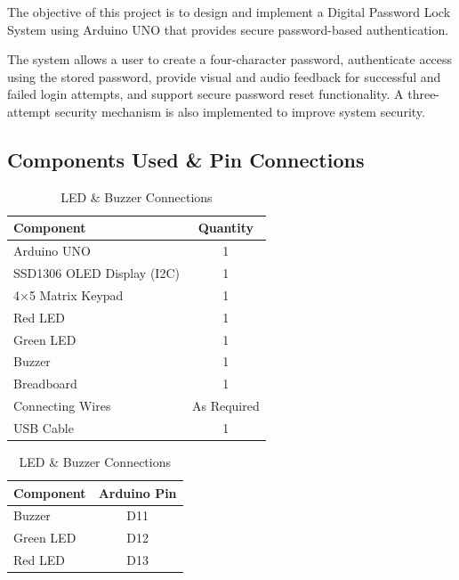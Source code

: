 The objective of this project is to design and implement a Digital Password Lock System using Arduino UNO that provides secure password-based authentication.

The system allows a user to create a four-character password, authenticate access using the stored password, provide visual and audio feedback for successful and failed login attempts, and support secure password reset functionality. A three-attempt security mechanism is also implemented to improve system security.


\subsection{Components Used \& Pin Connections}

\begin{table}[H]
\centering

\begin{minipage}[t]{0.48\textwidth}
\centering
\caption{Password Lock Components}
\label{tab:password_components}

\begin{tabular}{|p{4cm}|c|}
\hline
\textbf{Component} & \textbf{Quantity} \\
\hline
Arduino UNO & 1 \\
SSD1306 OLED Display (I2C) & 1 \\
4×5 Matrix Keypad & 1 \\
Red LED & 1 \\
Green LED & 1 \\
Buzzer & 1 \\
Breadboard & 1 \\
Connecting Wires & As Required \\
USB Cable & 1 \\
\hline
\end{tabular}

\end{minipage}
\hfill
\begin{minipage}[t]{0.47\textwidth}
\centering
\caption{LED \& Buzzer Connections}
\label{tab:password_led}

\begin{tabular}{|l|c|}
\hline
\textbf{Component} & \textbf{Arduino Pin} \\
\hline
Buzzer & D11 \\
Green LED & D12 \\
Red LED & D13 \\
\hline
\end{tabular}

\end{minipage}

\end{table}

